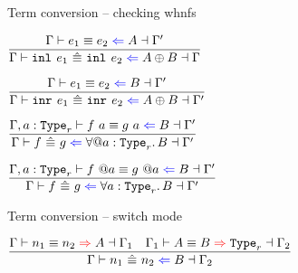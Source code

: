 \begin{frame}{Term conversion -- checking whnfs}

\begin{center}
  $\infrule{\checktermconv{\Gamma}{e_1}{e_2}{A}{\Gamma'}}{\checktermconvwhnf{\Gamma}{\inl{e_1}}{\inl{e_2}}{\Sum{A}{B}}{\Gamma}}$

  \vspace{1em}

  $\infrule{\checktermconv{\Gamma}{e_1}{e_2}{B}{\Gamma'}}{\checktermconvwhnf{\Gamma}{\inr{e_1}}{\inr{e_2}}{\Sum{A}{B}}{\Gamma'}}$

  \vspace{2em}

  $\infrule{\checktermconv{\extendtype{\Gamma}{a}[r]}{\tapp{f}{a}}{\tapp{g}{a}}{B}{\Gamma'}}{\checktermconvwhnf{\Gamma}{f}{g}{\ForallE{a}[r]{B}}{\Gamma'}}$

  \vspace{2em}

  $\infrule{\checktermconv{\extendtype{\Gamma}{a}[r]}{\itapp{f}{a}}{\itapp{g}{a}}{B}{\Gamma'}}{\checktermconvwhnf{\Gamma}{f}{g}{\ForallI{a}[r]{B}}{\Gamma'}}$
\end{center}

\end{frame}

\begin{frame}{Term conversion -- switch mode}

\begin{center}
  $\infrule{\infertermconv{\Gamma}{n_1}{n_2}{A}{\Gamma_1} \quad \infertypeconv{\Gamma_1}{A}{B}[r]{\Gamma_2}}{\checktermconvwhnf{\Gamma}{n_1}{n_2}{B}{\Gamma_2}}$
\end{center}

\end{frame}

